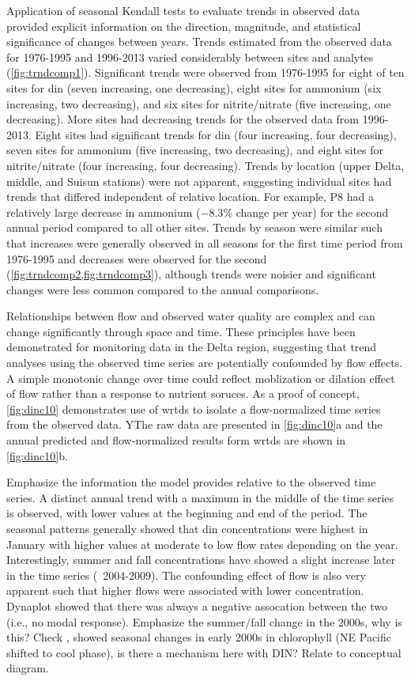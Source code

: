\documentclass[journal = esthag, manuscript = article]{achemso}\usepackage[]{graphicx}\usepackage[]{color}
\begin{document}
Application of seasonal Kendall tests to evaluate trends in observed data provided explicit information on the direction, magnitude, and statistical significance of changes between years. Trends estimated from the observed data for 1976-1995 and 1996-2013 varied considerably between sites and analytes (\cref{fig:trndcomp1}). Significant trends were observed from 1976-1995 for eight of ten sites for \ac{din} (seven increasing, one decreasing), eight sites for ammonium (six increasing, two decreasing), and six sites for nitrite/nitrate (five increasing, one decreasing).  More sites had decreasing trends for the observed data from 1996-2013.  Eight sites had significant trends for \ac{din} (four increasing, four decreasing), seven sites for ammonium (five increasing, two decreasing), and eight sites for nitrite/nitrate (four increasing, four decreasing). Trends by location (upper Delta, middle, and Suisun stations) were not apparent, suggesting individual sites had trends that differed independent of relative location.  For example, P8 had a relatively large decrease in ammonium ($-8.3$\% change per year) for the second annual period compared to all other sites. Trends by season were similar such that increases were generally observed in all seasons for the first time period from 1976-1995 and decreases were observed for the second (\cref{fig:trndcomp2,fig:trndcomp3}), although trends were noisier and significant changes were less common compared to the annual comparisons.

Relationships between flow and observed water quality are complex and can change significantly through space and time\cite{Hirsch10,Zhang16}. These principles have been demonstrated for monitoring data in the Delta region\cite{Jassby08,Novick15,Jabusch16}, suggesting that trend analyses using the observed time series are potentially confounded by flow effects.  A simple monotonic change over time could reflect moblization or dilation effect of flow rather than a response to nutrient soruces.  As a proof of concept, \cref{fig:dinc10} demonstrates use of \ac{wrtds} to isolate a flow-normalized time series from the observed data. YThe raw data are presented in \cref{fig:dinc10}a and the annual predicted and flow-normalized results form \ac{wrtds} are shown in \cref{fig:dinc10}b.   


Emphasize the information the model provides relative to the observed time series.  A distinct annual trend with a maximum in the middle of the time series is observed, with lower values at the beginning and end of the period.  The seasonal patterns generally showed that \ac{din} concentrations were highest in January with higher values at moderate to low flow rates depending on the year. Interestingly, summer and fall concentrations have showed a slight increase later in the time series (~2004-2009).  The confounding effect of flow is also very apparent such that higher flows were associated with lower concentration.  Dynaplot showed that there was always a negative assocation between the two (i.e., no modal response).  Emphasize the summer/fall change in the 2000s, why is this?  Check \cite{Cloern07}, showed seasonal changes in early 2000s in chlorophyll (NE Pacific shifted to cool phase), is there a mechanism here with DIN? Relate to conceptual diagram.
\end{document}
